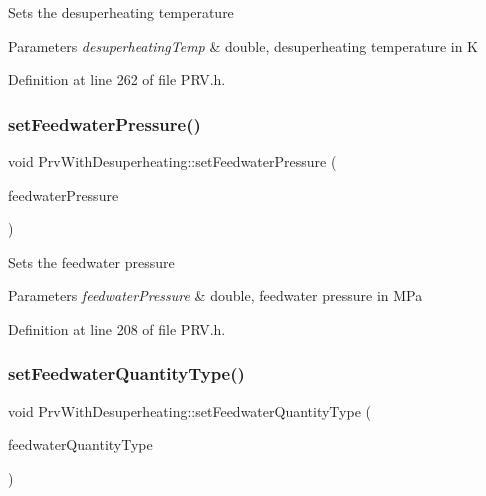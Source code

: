 Sets the desuperheating temperature


\begin{DoxyParams}{Parameters}
{\em desuperheating\+Temp} & double, desuperheating temperature in K \\
\hline
\end{DoxyParams}


Definition at line 262 of file P\+R\+V.\+h.

\mbox{\label{class_prv_with_desuperheating_a8494ebf87e5bd834f621b0c7ca257fbe}} 
\subsubsection{\texorpdfstring{set\+Feedwater\+Pressure()}{setFeedwaterPressure()}}
{\footnotesize\ttfamily void Prv\+With\+Desuperheating\+::set\+Feedwater\+Pressure (\begin{DoxyParamCaption}\item[{double}]{feedwater\+Pressure }\end{DoxyParamCaption})\hspace{0.3cm}{\ttfamily [inline]}}

Sets the feedwater pressure


\begin{DoxyParams}{Parameters}
{\em feedwater\+Pressure} & double, feedwater pressure in M\+Pa \\
\hline
\end{DoxyParams}


Definition at line 208 of file P\+R\+V.\+h.

\mbox{\label{class_prv_with_desuperheating_a3efaf028d1e6b8349a9e064605cc8d7a}} 
\subsubsection{\texorpdfstring{set\+Feedwater\+Quantity\+Type()}{setFeedwaterQuantityType()}}
{\footnotesize\ttfamily void Prv\+With\+Desuperheating\+::set\+Feedwater\+Quantity\+Type (\begin{DoxyParamCaption}\item[{\hyperlink{class_steam_properties_ae0294bedf7d178c2d8fb6aed0f62fbff}{Steam\+Properties\+::\+Thermodynamic\+Quantity}}]{feedwater\+Quantity\+Type }\end{DoxyParamCaption})\hspace{0.3cm}{\ttfamily [inline]}}

